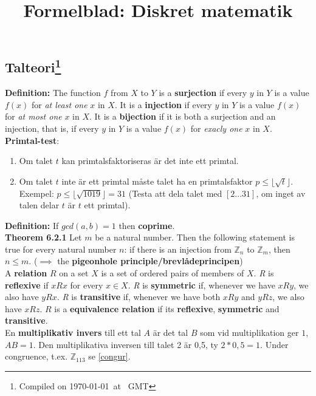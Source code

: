\documentclass{article}
\title{Formelblad: Diskret matematik}
\begin{document}
\begin{multicols}{2}
\section{Talteori\footnote{Compiled on \today\ at \currenttime \ GMT}}
\textbf{Definition:} The function $f$ from $X$ to $Y$ is a \textbf{surjection} if every $y$ in $Y$ is a value $f(x)$ for \textit{at least one} $x$ in $X$. It is a \textbf{injection} if every $y$ in $Y$ is a value $f(x)$ for \textit{at most one} $x$ in $X$. It is a \textbf{bijection} if it is both a surjection and an injection, that is, if every $y$ in $Y$ is a value $f(x)$ for \textit{exacly one} $x$ in $X$.\\
\newline
\textbf{Primtal-test}:
\begin{enumerate}
    \item Om talet $t$ kan primtalsfaktoriseras är det inte ett primtal.
    \item Om talet $t$ inte är ett primtal måste talet ha en primtalsfaktor $p \leq \lfloor \sqrt{t} \rfloor$. Exempel: $p \leq \lfloor \sqrt{1019} \rfloor = 31$ (Testa att dela talet med $[2... 31]$, om inget av talen delar $t$ är $t$ ett primtal).
\end{enumerate}
\newline
\textbf{Definition:} If $gcd(a,b) = 1$ then \textbf{coprime}.\\
\newline
\textbf{Theorem 6.2.1}
Let $m$ be a natural number. Then the following statement is true for every natural number $n$: if there is an injection from $\mathbb{Z}_n$ to $\mathbb{Z}_m$, then $n\leq m$. ($\implies$ the \textbf{pigeonhole principle/brevlådeprincipen})\\
\newline
A \textbf{relation} $R$ on a set $X$ is a set of ordered pairs of members of $X$. \textit{R} is \textbf{reflexive} if $xRx$ for every $x \in X$. \textit{R} is \textbf{symmetric} if, whenever we have $xRy$, we also have $yRx$. \textit{R} is \textbf{transitive} if, whenever we have both $xRy$ and $yRz$, we also have $xRz$. $R$ is a \textbf{equivalence relation} if its \textbf{reflexive}, \textbf{symmetric} and \textbf{transitive}.\\
\newline
En \textbf{multiplikativ invers} till ett tal $A$ är det tal $B$ som vid multiplikation ger $1$, $AB=1$. Den multiplikativa inversen till talet 2 är 0,5, ty $2*0,5=1$. Under congruence, t.ex. $\mathbb{Z}_{113}$ se \ref{congur}.



\end{multicols}
\end{document}
